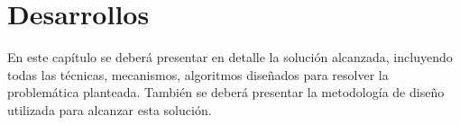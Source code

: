 \chapter{Desarrollos}\label{tecnicas}


\begin{tcolorbox}[width=\textwidth,colback={white},title={\textbf{Lineamientos del Capítulo Desarrollos}},colbacktitle=black,coltitle=white]    
En este capítulo se deberá presentar en detalle la solución alcanzada, incluyendo todas las técnicas, mecanismos, algoritmos diseñados para resolver la problemática planteada. También se deberá presentar la metodología de diseño utilizada para alcanzar esta solución.
\end{tcolorbox}    
